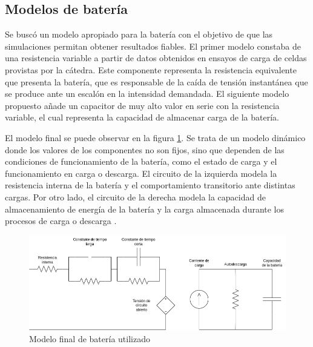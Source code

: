 \subsection{Modelos de batería}

Se buscó un modelo apropiado para la batería con el objetivo de que las simulaciones permitan obtener resultados fiables.
El primer modelo constaba de una resistencia variable a partir de datos obtenidos en ensayos de carga de celdas provistas por la cátedra.  
Este componente representa la resistencia equivalente que presenta la batería,
que es responsable de la caída de tensión instantánea que se produce ante un escalón en la intensidad demandada.
El siguiente modelo propuesto añade un capacitor de muy alto valor en serie con la resistencia variable,
el cual representa la capacidad de almacenar carga de la batería.

El modelo final se puede observar en la figura \ref{fig:bateria_3}.
Se trata de un modelo dinámico donde los valores de los componentes no son fijos,
sino que dependen de las condiciones de funcionamiento de la batería, como el estado de carga y el funcionamiento en carga o descarga.
El circuito de la izquierda modela la resistencia interna de la batería y el comportamiento transitorio ante distintas cargas.
Por otro lado, el circuito de la derecha modela la capacidad de almacenamiento de energía de la batería y la carga almacenada durante los procesos de carga o descarga \cite{modelo_bateria_1}.

\begin{figure}
    \centering
    \includegraphics[width=\textwidth]{images/modelo_bateria.png}
    \caption{Modelo final de batería utilizado}
    \label{fig:bateria_3}
\end{figure}

